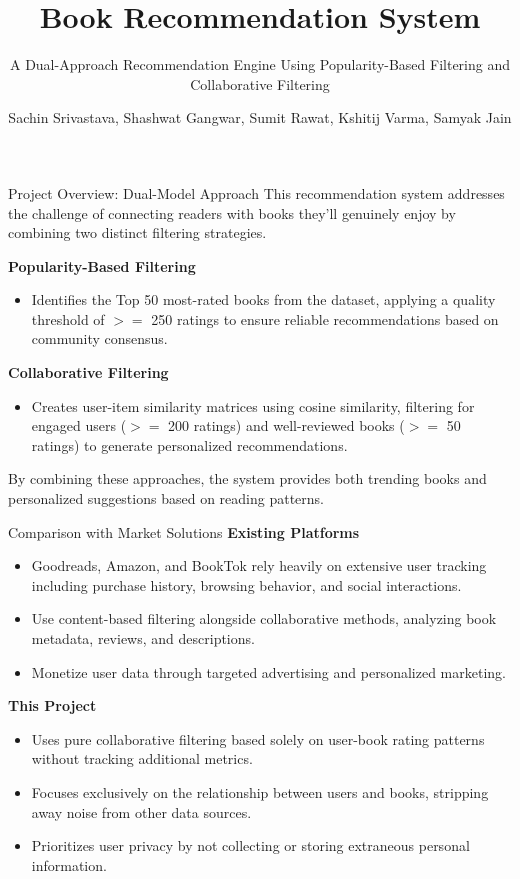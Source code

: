 \documentclass{beamer}
\title[Book Recommendation System]{Book Recommendation System}
\subtitle{A Dual-Approach Recommendation Engine Using Popularity-Based Filtering and Collaborative Filtering}
\author{Sachin Srivastava, Shashwat Gangwar, Sumit Rawat, Kshitij Varma, Samyak Jain}
\date{}
\def\ge{>=}%
\begin{document}
\begin{frame}
  \titlepage
\end{frame}

\begin{frame}{Project Overview: Dual-Model Approach}
  This recommendation system addresses the challenge of connecting readers with books they'll genuinely enjoy by combining two distinct filtering strategies.
  
  \vspace{0.3cm}
  \textbf{Popularity-Based Filtering}
  \begin{itemize}
      \item Identifies the Top 50 most-rated books from the dataset, applying a quality threshold of $\ge$ 250 ratings to ensure reliable recommendations based on community consensus.
  \end{itemize}
  
  \vspace{0.2cm}
  \textbf{Collaborative Filtering}
  \begin{itemize}
      \item Creates user-item similarity matrices using cosine similarity, filtering for engaged users ($\ge$ 200 ratings) and well-reviewed books ($\ge$ 50 ratings) to generate personalized recommendations.
  \end{itemize}
  
  \vspace{0.3cm}
  By combining these approaches, the system provides both trending books and personalized suggestions based on reading patterns.
\end{frame}

\begin{frame}{Comparison with Market Solutions}
  \textbf{Existing Platforms}
  \begin{itemize}
      \item Goodreads, Amazon, and BookTok rely heavily on extensive user tracking including purchase history, browsing behavior, and social interactions.
      \item Use content-based filtering alongside collaborative methods, analyzing book metadata, reviews, and descriptions.
      \item Monetize user data through targeted advertising and personalized marketing.
  \end{itemize}
  
  \vspace{0.3cm}
  \textbf{This Project}
  \begin{itemize}
      \item Uses pure collaborative filtering based solely on user-book rating patterns without tracking additional metrics.
      \item Focuses exclusively on the relationship between users and books, stripping away noise from other data sources.
      \item Prioritizes user privacy by not collecting or storing extraneous personal information.
  \end{itemize}
\end{frame}
\end{document}
